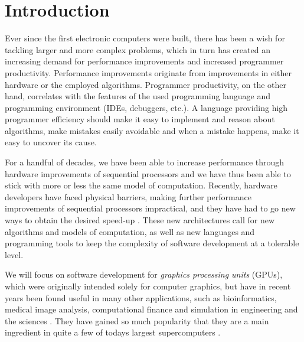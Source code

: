 
\chapter{Introduction}
Ever since the first electronic computers were built, there has been a
wish for tackling larger and more complex problems, which in turn has
created an increasing demand for performance improvements and
increased programmer productivity. Performance improvements originate
from improvements in either hardware or the employed
algorithms. Programmer productivity, on the other hand, correlates
with the features of the used programming language and programming
environment (IDEs, debuggers, etc.). A language providing high
programmer efficiency should make it easy to implement and reason
about algorithms, make mistakes easily avoidable and when a mistake
happens, make it easy to uncover its cause. 

For a handful of decades, we have been able to increase performance
through hardware improvements of sequential processors and we have
thus been able to stick with more or less the same model of
computation. Recently, hardware developers have faced physical
barriers, making further performance improvements of sequential
processors impractical, and they have had to go new ways to obtain the
desired speed-up \cite{sutter2006freelunchisover}. These new architectures call
for new algorithms and models of computation, as well as new languages
and programming tools to keep the complexity of software development
at a tolerable level.

We will focus on software development for \textit{graphics processing
  units} (GPUs), which were originally intended solely for computer
graphics, but have in recent years been found useful in many other
applications, such as bioinformatics, medical image analysis,
computational finance and simulation in engineering and the sciences
\cite{hwy2011emerald, hwu2011jade, owens2007survey}. They have gained
so much popularity that they are a main ingredient in quite a few of
todays largest supercomputers \cite{Top500}.

